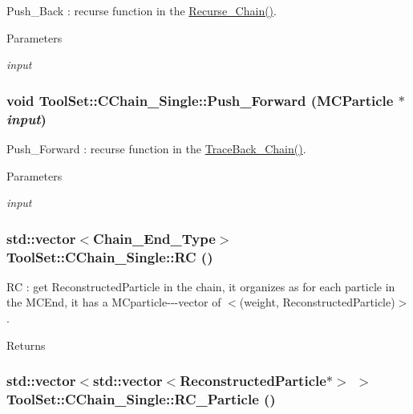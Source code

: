 Push\_\-Back : recurse function in the \hyperlink{classToolSet_1_1CChain__Single_a6e24f84cd12c38d28f4e154f547d4170}{Recurse\_\-Chain()}. 
\begin{DoxyParams}{Parameters}
\item[{\em input}]\end{DoxyParams}
\hypertarget{classToolSet_1_1CChain__Single_ad261fc82205fec60d46ccda275256fe3}{
\subsubsection[{Push\_\-Forward}]{\setlength{\rightskip}{0pt plus 5cm}void ToolSet::CChain\_\-Single::Push\_\-Forward (MCParticle $\ast$ {\em input})}}
\label{classToolSet_1_1CChain__Single_ad261fc82205fec60d46ccda275256fe3}


Push\_\-Forward : recurse function in the \hyperlink{classToolSet_1_1CChain__Single_a8f0623cb1122dc17a82f3b86289b9681}{TraceBack\_\-Chain()}. 
\begin{DoxyParams}{Parameters}
\item[{\em input}]\end{DoxyParams}
\hypertarget{classToolSet_1_1CChain__Single_a3783b04dfa98bee280070fa443afa878}{
\subsubsection[{RC}]{\setlength{\rightskip}{0pt plus 5cm}std::vector$<$Chain\_\-End\_\-Type$>$ ToolSet::CChain\_\-Single::RC ()}}
\label{classToolSet_1_1CChain__Single_a3783b04dfa98bee280070fa443afa878}


RC : get ReconstructedParticle in the chain, it organizes as for each particle in the MCEnd, it has a MCparticle-\/-\/-\/vector of $<$(weight, ReconstructedParticle)$>$. \begin{DoxyReturn}{Returns}

\end{DoxyReturn}
\hypertarget{classToolSet_1_1CChain__Single_af928f52ff7640aeef93083b9fbe98b65}{
\subsubsection[{RC\_\-Particle}]{\setlength{\rightskip}{0pt plus 5cm}std::vector$<$std::vector$<$ReconstructedParticle$\ast$$>$ $>$ ToolSet::CChain\_\-Single::RC\_\-Particle ()}}
\label{classToolSet_1_1CChain__Single_af928f52ff7640aeef93083b9fbe98b65}


